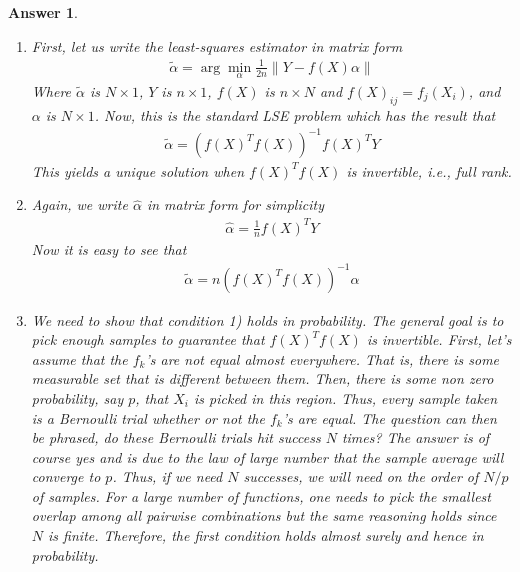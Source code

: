 \documentclass[12pt]{article}
\theoremstyle{colon}
\newtheorem*{answer}{Answer}
\begin{document}
\begin{answer}
  \leavevmode
  \begin{enumerate}[label=\arabic*)]
    \item First, let us write the least-squares estimator in matrix form
      \begin{gather*}
        \tilde{\alpha} = \arg\min_\alpha \frac{1}{2n} \lVert Y - f(X) \alpha \rVert
      \end{gather*}
      Where $\tilde{\alpha}$ is $N \times 1$, $Y$ is $n \times 1$, $f(X)$ is $n \times N$ and $f(X)_{ij} = f_j(X_i)$, and $\alpha$ is $N \times 1$. Now, this is the standard LSE problem which has the result that
      \begin{gather*}
        \tilde{\alpha} = (f(X)^T f(X))^{-1} f(X)^T Y
      \end{gather*}
      This yields a unique solution when $f(X)^T f(X)$ is invertible, i.e., full rank.

    \item Again, we write $\widehat{\alpha}$ in matrix form for simplicity
      \begin{gather*}
        \widehat{\alpha} = \frac{1}{n} f(X)^T Y
      \end{gather*}
      Now it is easy to see that
      \begin{gather*}
        \tilde{\alpha} = n(f(X)^T f(X))^{-1} \widehat{\alpha}
      \end{gather*}

    \item We need to show that condition 1) holds in probability. The general goal is to pick enough samples to guarantee that $f(X)^T f(X)$ is invertible. First, let's assume that the $f_k$'s are not equal almost everywhere. That is, there is some measurable set that is different between them. Then, there is some non zero probability, say $p$, that $X_i$ is picked in this region. Thus, every sample taken is a Bernoulli trial whether or not the $f_k$'s are equal. The question can then be phrased, do these Bernoulli trials hit success $N$ times? The answer is of course yes and is due to the law of large number that the sample average will converge to $p$. Thus, if we need $N$ successes, we will need on the order of $N/p$ of samples. For a large number of functions, one needs to pick the smallest overlap among all pairwise combinations but the same reasoning holds since $N$ is finite. Therefore, the first condition holds almost surely and hence in probability.


\end{enumerate}
\end{answer}
\end{document}
